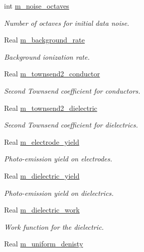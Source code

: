 \begin{DoxyCompactItemize}
int \hyperlink{classmorrow__lowke_aaea4ac6fd1372821ce1641613091230b}{m\+\_\+noise\+\_\+octaves}
\begin{DoxyCompactList}\small\item\em Number of octaves for initial data noise. \end{DoxyCompactList}\item 
Real \hyperlink{classmorrow__lowke_a855aed50fe7df0dd04415d564a4d6988}{m\+\_\+background\+\_\+rate}
\begin{DoxyCompactList}\small\item\em Background ionization rate. \end{DoxyCompactList}\item 
Real \hyperlink{classmorrow__lowke_adac34db9273ce7560ad71e968dadec0a}{m\+\_\+townsend2\+\_\+conductor}
\begin{DoxyCompactList}\small\item\em Second Townsend coefficient for conductors. \end{DoxyCompactList}\item 
Real \hyperlink{classmorrow__lowke_a3e076d4dfbadde58715452aef8071513}{m\+\_\+townsend2\+\_\+dielectric}
\begin{DoxyCompactList}\small\item\em Second Townsend coefficient for dielectrics. \end{DoxyCompactList}\item 
Real \hyperlink{classmorrow__lowke_a6c1ce2fd5df5d409cb77b38acc680f27}{m\+\_\+electrode\+\_\+yield}
\begin{DoxyCompactList}\small\item\em Photo-\/emission yield on electrodes. \end{DoxyCompactList}\item 
Real \hyperlink{classmorrow__lowke_a5a5ae3870193ab028cb55838fc6452a0}{m\+\_\+dielectric\+\_\+yield}
\begin{DoxyCompactList}\small\item\em Photo-\/emission yield on dielectrics. \end{DoxyCompactList}\item 
Real \hyperlink{classmorrow__lowke_ab377ab1a3063edca6887e2ca41d476c7}{m\+\_\+dielectric\+\_\+work}
\begin{DoxyCompactList}\small\item\em Work function for the dielectric. \end{DoxyCompactList}\item 
Real \hyperlink{classmorrow__lowke_af5b6093cc717fbf42326e8c99f942efa}{m\+\_\+uniform\+\_\+denisty}

\end{DoxyCompactItemize}

